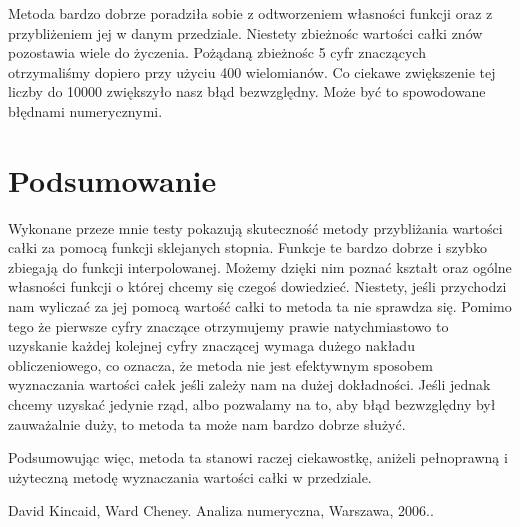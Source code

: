 \documentclass[a4paper]{article}
\newcommand{\RomanNumeralCaps}[1]
    {\MakeUppercase{\romannumeral #1}}
\begin{document}
   Metoda bardzo dobrze poradziła sobie z odtworzeniem własności funkcji oraz z przybliżeniem jej w danym przedziale.
   Niestety zbieżnośc wartości całki znów pozostawia wiele do życzenia. Pożądaną zbieżnośc 5 cyfr znaczących otrzymaliśmy
   dopiero przy użyciu 400 wielomianów. Co ciekawe zwiększenie tej liczby do 10000 zwiększyło nasz błąd bezwzględny. Może być to spowodowane
   błędnami numerycznymi.

\newpage
\section{Podsumowanie}
    Wykonane przeze mnie testy pokazują skuteczność metody przybliżania wartości całki za pomocą funkcji sklejanych 
    \RomanNumeralCaps{3} stopnia. Funkcje te bardzo dobrze i szybko zbiegają do funkcji interpolowanej. Możemy dzięki nim 
    poznać kształt oraz ogólne własności funkcji o której chcemy się czegoś dowiedzieć. Niestety, jeśli przychodzi nam wyliczać 
    za jej pomocą wartość całki to metoda ta nie sprawdza się. Pomimo tego że pierwsze cyfry znaczące otrzymujemy prawie natychmiastowo
    to uzyskanie każdej kolejnej cyfry znaczącej wymaga dużego nakładu obliczeniowego, co oznacza, że metoda nie jest efektywnym
    sposobem wyznaczania wartości całek jeśli zależy nam na dużej dokładności. Jeśli jednak chcemy uzyskać jedynie rząd, albo
    pozwalamy na to, aby błąd bezwzględny był zauważalnie duży, to metoda ta może nam bardzo dobrze służyć.

    Podsumowując więc, metoda ta stanowi raczej ciekawostkę, aniżeli pełnoprawną i użyteczną metodę wyznaczania wartości całki w przedziale.

    \begin{thebibliography}{9}
        David Kincaid, Ward Cheney. 
        Analiza numeryczna, Warszawa, 2006..
    \end{thebibliography} 
\end{document}
